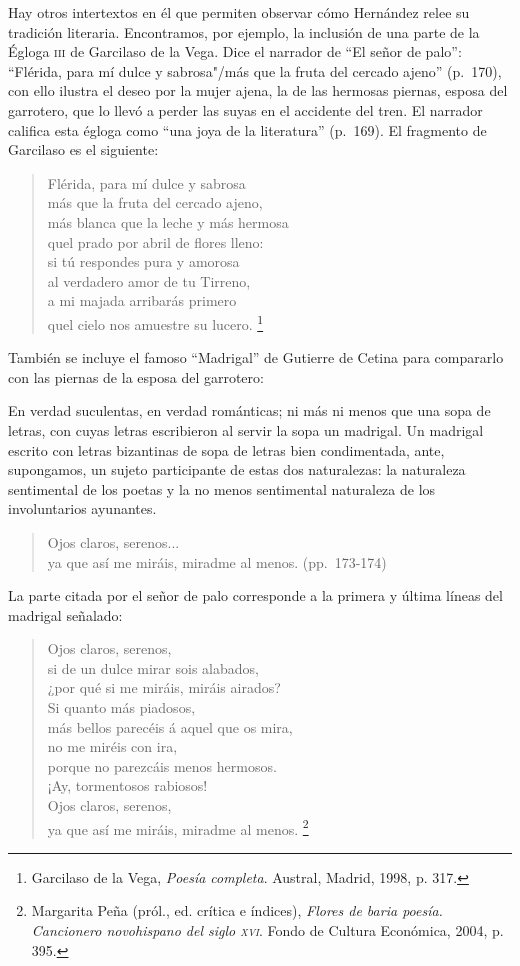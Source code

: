 \documentclass[14pt,twoside,final]{extbook} %
\let\oldfootnote\footnote
\renewcommand\footnote[1]{%
\oldfootnote{\hspace{1mm}#1}}
\begin{document}
Hay otros intertextos en él que permiten observar cómo Hernández relee su tradición literaria. Encontramos, por ejemplo, la inclusión de una parte de la Égloga \textsc{iii} de Garcilaso de la Vega. Dice el narrador de ``El señor de palo'': ``Flérida, para mí dulce y sabrosa"/más que la fruta del cercado ajeno'' (p.~170), con ello ilustra el deseo por la mujer ajena, la de las hermosas piernas, esposa del garrotero, que lo llevó a perder las suyas en el accidente del tren. El narrador califica esta égloga como ``una joya de la literatura'' (p.~169). El fragmento de Garcilaso es el siguiente:
\begin{verse}
Flérida, para mí dulce y sabrosa \\
más que la fruta del cercado ajeno, \\
más blanca que la leche y más hermosa \\
qu\textquotesingle{}el prado por abril de flores lleno: \\
si tú respondes pura y amorosa \\
al verdadero amor de tu Tirreno, \\
a mi majada arribarás primero \\
qu\textquotesingle{}el cielo nos amuestre su lucero.\footnote{Garcilaso de la Vega, \emph{Poesía completa}. Austral, Madrid, 1998, p. 317.}
\end{verse}
También se incluye el famoso ``Madrigal'' de Gutierre de Cetina para compararlo con las piernas de la esposa del garrotero:
\begin{quoting}
En verdad suculentas, en verdad románticas; ni más ni menos que una sopa de letras, con cuyas letras escribieron al servir la sopa un madrigal. Un madrigal escrito con letras bizantinas
de sopa de letras bien condimentada, ante, supongamos, un sujeto participante de estas dos naturalezas: la naturaleza sentimental de los poetas y la no menos sentimental naturaleza de los involuntarios ayunantes.
\begin{verse}
Ojos claros, serenos... \\
ya que así me miráis, miradme al menos. (pp.~\mbox{173-174})
\end{verse}
\end{quoting}
La parte citada por el señor de palo corresponde a la primera y última líneas del madrigal señalado:
\begin{verse}
Ojos claros, serenos, \\
si de un dulce mirar sois alabados, \\
¿por qué si me miráis, miráis airados? \\
Si quanto más piadosos, \\
más bellos parecéis á aquel que os mira, \\
no me miréis con ira, \\
porque no parezcáis menos hermosos. \\
¡Ay, tormentosos rabiosos! \\
Ojos claros, serenos, \\
ya que así me miráis, miradme al menos.\footnote{Margarita Peña (pról., ed. crítica e índices), \emph{Flores de baria poesía. Cancionero novohispano del siglo \textsc{xvi}}. Fondo de Cultura Económica, 2004, p. 395.}
\end{verse}
\end{document}
